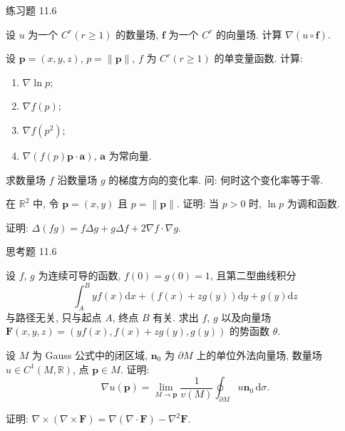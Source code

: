 \begin{exblock}{练习题 11.6}
\item 设 $u$ 为一个 $C^{r}(r\geqslant1)$ 的数量场, $\boldsymbol{f}$ 为一个 $C^{r}$ 的向量场. 计算 $\nabla(u\circ\boldsymbol{f})$.

\item 设 $\boldsymbol{p}=(x,y,z)$, $p=\|\boldsymbol{p}\|$, $f$ 为 $C^{r}(r\geqslant1)$ 的单变量函数. 计算:

  \begin{enumerate}[label=(\arabic*),leftmargin=2.6em,itemsep=0.15\baselineskip,topsep=0.2\baselineskip]

  \item $\nabla\ln p$;

  \item $\nabla f(p)$;

  \item $\nabla f(p^{2})$;

  \item $\nabla(f(p)\boldsymbol{p}\cdot\boldsymbol{a})$, $\boldsymbol{a}$ 为常向量.

  \end{enumerate}

\item 求数量场 $f$ 沿数量场 $g$ 的梯度方向的变化率. 问: 何时这个变化率等于零.

\item 在 $\mathbb{R}^{2}$ 中, 令 $\boldsymbol{p}=(x,y)$ 且 $p=\|\boldsymbol{p}\|$. 证明: 当 $p>0$ 时, $\ln p$ 为调和函数.

\item 证明: $\Delta(fg)=f\Delta g+g\Delta f+2\nabla f\cdot\nabla g$.
\end{exblock}

\begin{exblock}{思考题 11.6}
\item 设 $f$, $g$ 为连续可导的函数, $f(0)=g(0)=1$, 且第二型曲线积分
\[
\int_{A}^{B}yf(x)\mathrm{d}x+(f(x)+zg(y))\mathrm{d}y+g(y)\mathrm{d}z
\]
与路径无关, 只与起点 $A$, 终点 $B$ 有关. 求出 $f$, $g$ 以及向量场 $\boldsymbol{F}(x,y,z)=(yf(x),f(x)+zg(y),g(y))$ 的势函数 $\theta$.

\item 设 $M$ 为 Gauss 公式中的闭区域, $\boldsymbol{n}_{0}$ 为 $\partial M$ 上的单位外法向量场, 数量场 $u\in C^{1}(M,\mathbb{R})$, 点 $\boldsymbol{p}\in M$. 证明:
\[
\nabla u(\boldsymbol{p})=\lim_{M\to\boldsymbol{p}}\frac{1}{v(M)}\oint_{\partial M}u\boldsymbol{n}_{0}\,\mathrm{d}\sigma.
\]

\item 证明: $\nabla\times(\nabla\times\boldsymbol{F})=\nabla(\nabla\cdot\boldsymbol{F})-\nabla^{2}\boldsymbol{F}$.
\end{exblock}
